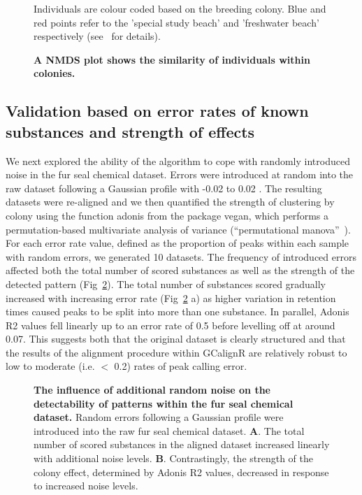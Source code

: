 \documentclass[10pt,letterpaper]{article}
\begin{document}
\begin{figure}[htbp]
\centering
\caption{\textbf{A NMDS plot shows the similarity of individuals within colonies.}}
Individuals are colour coded based on the breeding colony. Blue and red points refer to the 'special study beach' and 'freshwater beach' respectively (see~\cite{Stoffel.2015} for details).
\label{Fig:Fig5}
\end{figure} 

\subsection*{Validation based on error rates of known substances and  strength of effects}

We next explored the ability of the algorithm to cope with randomly introduced noise in the fur seal chemical dataset.  Errors were introduced at random into the raw dataset following a Gaussian profile with -0.02 to 0.02 .  The resulting datasets were re-aligned and we then quantified the strength of clustering by colony using the function adonis from the package vegan, which performs a permutation-based multivariate analysis of variance (“permutational manova”~\cite{Anderson.2001}). For each error rate value, defined as the proportion of peaks within each sample with random errors, we generated 10 datasets.  The frequency of introduced errors affected both the total number of scored substances as well as the strength of the detected pattern (Fig~\ref{Fig:Fig6}). The total number of substances scored gradually increased with increasing error rate (Fig~\ref{Fig:Fig6} a) as higher variation in retention times caused peaks to be split into more than one substance.  In parallel, Adonis R2 values fell linearly up to an error rate of 0.5 before levelling off at around 0.07. This suggests both that the original dataset is clearly structured and that the results of the alignment procedure within GCalignR are relatively robust to low to moderate (i.e. $<$ 0.2) rates of peak calling error.

\begin{figure}[htbp]
\centering
\caption{\textbf{The influence of additional random noise on the detectability of patterns within the fur seal chemical dataset.}
Random errors following a Gaussian profile were introduced into the raw fur seal chemical dataset. \textbf{A}. The total number of scored substances in the aligned dataset increased linearly with additional noise levels. \textbf{B}. Contrastingly, the strength of the colony effect, determined by Adonis R2 values, decreased in response to increased noise levels.}
\label{Fig:Fig6}
\end{figure} 
\end{document}
